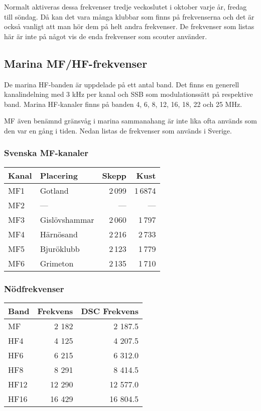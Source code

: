 Normalt aktiveras dessa frekvenser tredje veckoslutet i oktober varje
år, fredag till söndag. Då kan det vara många klubbar som finns på
frekvenserna och det är också vanligt att man hör dem på helt andra
frekvenser. De frekvenser som listas här är inte på något vis de enda
frekvenser som scouter använder.

\clearpage

\subsection{Marina MF/HF-frekvenser}

De marina HF-banden är uppdelade på ett antal band. Det finns en
generell kanalindelning med 3 kHz per kanal och SSB som
modulationssätt på respektive band. Marina HF-kanaler finns på banden
4, 6, 8, 12, 16, 18, 22 och 25 MHz.

MF även benämnd gränsvåg i marina sammanahang är inte lika ofta
används som den var en gång i tiden. Nedan listas de frekvenser som
används i Sverige.

\subsubsection{Svenska MF-kanaler}

\begin{longtable}{llrr}
\textbf{Kanal} & \textbf{Placering} & \textbf{Skepp} & \textbf{Kust}  \\ \hline
\endhead

MF1 & Gotland       & 2\,099 & 1\,6874 \\
MF2 & ---           & ---  & ---   \\
MF3 & Gislövshammar & 2\,060 & 1\,797  \\
MF4 & Härnösand     & 2\,216 & 2\,733  \\
MF5 & Bjuröklubb    & 2\,123 & 1\,779  \\
MF6 & Grimeton      & 2\,135 & 1\,710
\end{longtable}

\subsubsection{Nödfrekvenser}

\begin{longtable}{lrr}
\textbf{Band} & \textbf{Frekvens} & \textbf{DSC Frekvens}\\ \hline \endhead

MF   & 2 182  & 2 187.5  \\
HF4  & 4 125  & 4 207.5  \\
HF6  & 6 215  & 6 312.0  \\
HF8  & 8 291  & 8 414.5  \\
HF12 & 12 290 & 12 577.0 \\
HF16 & 16 429 & 16 804.5 \\
\end{longtable}

